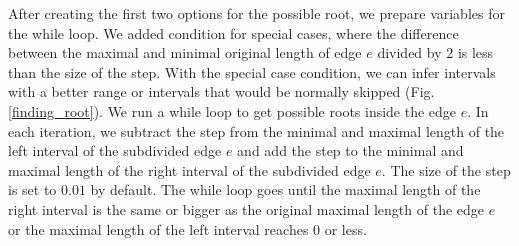 After creating the first two options for the possible root, we prepare variables for the while loop. We added condition for special cases, where the difference between the maximal and minimal original length of edge $e$ divided by $2$ is less than the size of the step. With the special case condition, we can infer intervals with a better range or intervals that would be normally skipped (Fig. \ref{finding_root}). We run a while loop to get possible roots inside the edge $e$. In each iteration, we subtract the step from the minimal and maximal length of the left interval of the subdivided edge $e$ and add the step to the minimal and maximal length of the right interval of the subdivided edge $e$. The size of the step is set to $0.01$ by default. The while loop goes until the maximal length of the right interval is the same or bigger as the original maximal length of the edge $e$ or the maximal length of the left interval reaches $0$ or less.


